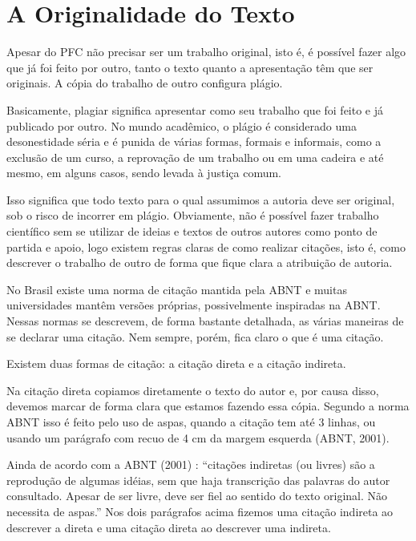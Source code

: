 

\chapter{A Originalidade do Texto}

Apesar do PFC não precisar ser um trabalho original, isto é, é possível fazer algo que já foi feito por outro, tanto o texto quanto a apresentação têm que ser originais. A cópia do trabalho de outro configura plágio.

Basicamente, plagiar significa apresentar como seu trabalho que foi feito e já publicado por outro. No mundo acadêmico, o plágio é considerado uma desonestidade séria e é punida de várias formas, formais e informais, como a exclusão de um curso, a reprovação de um trabalho ou em uma cadeira e até mesmo, em alguns casos, sendo levada à justiça comum.

Isso significa que todo texto para o qual assumimos a autoria deve ser original, sob o risco de incorrer em plágio. Obviamente, não é possível fazer trabalho científico sem se utilizar de ideias e textos de outros autores como ponto de partida e apoio, logo existem regras claras de como realizar citações, isto é, como descrever o trabalho de outro de forma que fique clara a atribuição de autoria.

No Brasil existe uma norma de citação mantida pela ABNT e muitas universidades mantêm versões próprias, possivelmente inspiradas na ABNT. Nessas normas se descrevem, de forma bastante detalhada, as várias maneiras de se declarar uma citação. Nem sempre, porém, fica claro o que é uma citação.

Existem duas formas de citação: a citação direta e a citação indireta.

Na citação direta copiamos diretamente o texto do autor e, por causa disso, devemos marcar de forma clara que estamos fazendo essa cópia. Segundo a norma ABNT isso é feito pelo uso de aspas, quando a citação tem até 3 linhas, ou usando um parágrafo com recuo de 4 cm da margem esquerda (ABNT, 2001).

Ainda de acordo com a ABNT (2001) :
“citações indiretas  (ou livres) são a reprodução de algumas idéias, sem que haja transcrição das palavras do autor consultado. Apesar de ser livre, deve ser fiel ao sentido do texto original. Não necessita de aspas.”
Nos dois parágrafos acima fizemos uma citação indireta ao descrever a direta e uma citação direta ao descrever uma indireta.
